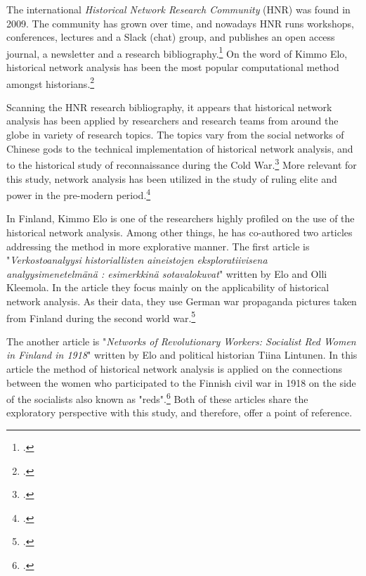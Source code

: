 The international \textit{Historical Network Research Community} (HNR) was found in 2009. The community has grown over time, and nowadays HNR runs workshops, conferences, lectures and a Slack (chat) group, and publishes an open access journal, a newsletter and a research bibliography.\footcite{hnr} On the word of Kimmo Elo, historical network analysis has been the most popular computational method amongst historians.\footcite[p. 22.]{elo16} 

Scanning the HNR research bibliography, it appears that historical network analysis has been applied by researchers and research teams from around the globe in variety of research topics. The topics vary from the social networks of Chinese gods to the technical implementation of historical network analysis, and to the historical study of reconnaissance during the Cold War.\footcites[p. 22.]{elo16}{hnrbib} More relevant for this study, network analysis has been utilized in the study of ruling elite and power in the pre-modern period.\footcite[See e. g. Ruth Ahnert's and Sebastian E. Ahnert's book \textit{Tudor Networks of Power} (2023) or Paul D Mclean's article \textit{Widening Access While Tightening Control: Office-Holding, Marriages, and Elite Consolidation in Early Modern Poland} (2004).]{JonVidarEt} 
 
In Finland, Kimmo Elo is one of the researchers highly profiled on the use of the historical network analysis. Among other things, he has co-authored two articles addressing the method in more explorative manner. The first article is "\textit{Verkostoanalyysi historiallisten aineistojen eksploratiivisena analyysimenetelmänä : esimerkkinä sotavalokuvat}" written by Elo and Olli Kleemola. In the article they focus mainly on the applicability of historical network analysis. As their data, they use German war propaganda pictures taken from Finland during the second world war.\footcite{eloAklee15}

The another article is "\textit{Networks of Revolutionary Workers: Socialist Red Women in Finland in 1918}" written by Elo and political historian Tiina Lintunen. In this article the method of historical network analysis is applied on the connections between the women who participated to the Finnish civil war in 1918 on the side of the socialists also known as "reds".\footcite[Almost the same article is found in Finnish in the \textit{Historiallinen Aikakauskirja} 116 (2/2018).]{LintunenAndElo2019} Both of these articles share the exploratory perspective with this study, and therefore, offer a point of reference. 

